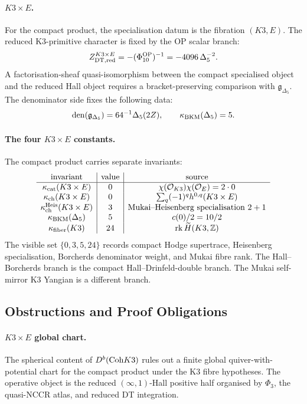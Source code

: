 \paragraph{\(K3\times E\).}
For the compact product, the specialisation datum is the fibration
\((K3,E)\). The reduced K3-primitive character is fixed by the OP
scalar branch:
\[
  Z^{K3\times E}_{\mathrm{DT},\mathrm{red}}
  =-(\Phi_{10}^{\mathrm{OP}})^{-1}
  =-4096\,\Delta_5^{-2}.
\]
A factorisation-sheaf quasi-isomorphism between the compact specialised
object and the reduced Hall object requires a bracket-preserving
comparison with \(\mathfrak g_{\Delta_5}\). The denominator side fixes
the following data:
\[
  \operatorname{den}(\mathfrak g_{\Delta_5})
  =64^{-1}\Delta_5(2Z),
  \qquad
  \kappa_{\mathrm{BKM}}(\Delta_5)=5.
\]

\paragraph{The four \(K3\times E\) constants.}
The compact product carries separate invariants:
\[
\begin{array}{c|c|c}
\text{invariant} & \text{value} & \text{source} \\
\hline
\kappa_{\mathrm{cat}}(K3\times E) & 0 &
\chi(\mathcal{O}_{K3})\chi(\mathcal{O}_E)=2\cdot0 \\
\kappa_{\mathrm{ch}}(K3\times E) & 0 &
\sum_q(-1)^qh^{0,q}(K3\times E) \\
\kappa_{\mathrm{ch}}^{\mathrm{Heis}}(K3\times E) & 3 &
\text{Mukai--Heisenberg specialisation }2+1 \\
\kappa_{\mathrm{BKM}}(\Delta_5) & 5 &
c(0)/2=10/2 \\
\kappa_{\mathrm{fiber}}(K3) & 24 &
\mathrm{rk}\,\widetilde H(K3,\mathbb{Z})
\end{array}
\]
The visible set \(\{0,3,5,24\}\) records compact Hodge supertrace,
Heisenberg specialisation, Borcherds denominator weight, and Mukai
fibre rank. The Hall--Borcherds branch is the compact
Hall--Drinfeld-double branch. The Mukai self-mirror K3 Yangian is a
different branch.

\subsection*{Obstructions and Proof Obligations}

\paragraph{\(K3\times E\) global chart.}
The spherical content of \(D^{b}(\mathrm{Coh} K3)\) rules out a finite global
quiver-with-potential chart for the compact product under the K3 fibre
hypotheses. The operative object is the reduced \((\infty,1)\)-Hall
positive half organised by \(\Phi_3\), the quasi-NCCR atlas, and
reduced DT integration.

